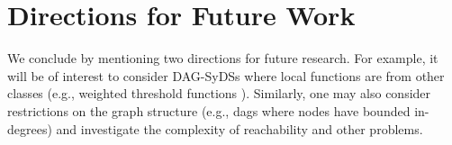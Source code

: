 \section{Directions for  Future Work}
\label{sec:concl}
 
We conclude by mentioning two directions for future research.
For example, it will be of interest to consider 
DAG-SyDSs where local functions are from other classes
(e.g., weighted threshold functions \cite{Crama-Hammer-2011}).
Similarly, one may also consider restrictions
on the graph structure (e.g., dags where nodes have
bounded in-degrees) and investigate 
the complexity of reachability and other problems.


\iffalse
\noindent
\paragraph{Conclusions.}


\paragraph{Open Questions.}

\begin{itemize}
\item For DAG linear SyDSs, how long can a phase space cycle and transient be,
as a function of depth.

\item For bounded degree DAG  SyDSs, how long can a phase space cycle and transient be,
as a function of depth.

\item For various classes of Boolean functions of interest, 
how long can a phase space cycle and transient be?
(If they are polynomially bounded as a function of the number of nodes,
then reachability is polynomially solvable.)
\end{itemize}
\fi
